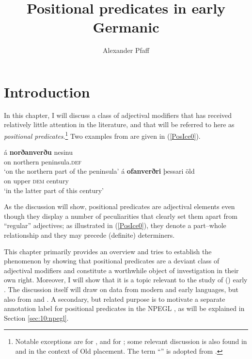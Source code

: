 \documentclass[output=paper,colorlinks,citecolor=brown]{langscibook}
\author{Alexander Pfaff\orcid{}\affiliation{University of Stuttgart}}
\title{Positional predicates in early Germanic }
\begin{document}
\maketitle

\section{Introduction} 

In this chapter, I will discuss a class of adjectival modifiers that has received relatively little attention in the literature, and that will be referred to here 
as \textit{positional predicates}.\footnote{Notable exceptions are \citet{Marib} for , and \citet{Pfaff2015,Pfaff2017} for ; some relevant discussion is also found in \citet{Fischer01} and   \citet{Grabski17} in the context of Old   placement. The term ``'' is adopted from \citet{Pfaff2015,Pfaff2017}. }  
Two examples from  are given in (\ref{PosIce0}).


\begin{exe}
   \ex \label{PosIce0}
     \begin{xlist}  
         \ex \gll á \textbf{norðanverðu} nesinu \\
           on  northern   peninsula.\textsc{def}  \\
       \glt `on the northern part of the peninsula'  
         \ex \gll á \textbf{ofanverðri} þessari öld \\
           on   upper  \textsc{dem}  century  \\
         \glt `in the latter part of this century'  
    \end{xlist}
\end{exe}


As the discussion will show, positional predicates are adjectival elements even though they display a number of peculiarities that clearly set them apart from ``regular'' adjectives; as illustrated in (\ref{PosIce0}), they denote a part--whole relationship and they may precede (definite) determiners. 

This chapter primarily provides an overview and tries to establish the phenomenon by showing that positional predicates are a deviant class of adjectival modifiers and constitute a worthwhile object of investigation in their own right. Moreover, I will show that it is a topic relevant to the study of () early  . The discussion itself will draw on data from modern  and early  languages, but also from  and .  
A secondary, but related purpose is to motivate a separate annotation label for positional predicates in the NPEGL , as will be explained in Section \ref{sec:10:npegl}.
\end{document}
